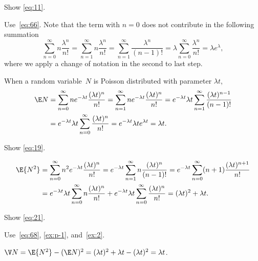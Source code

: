 \begin{exercise} \label{ex:2}
 Show \cref{eq:11}.
\begin{hint}
Use~\cref{eq:66}. Note that the term with $n=0$ does not contribute in the following summation
\begin{equation*}
\sum_{n=0}^\infty n \frac{\lambda^n}{n!} = \sum_{n=1}^\infty n \frac{\lambda^n}{n!} = \sum_{n=1}^\infty \frac{\lambda^n}{(n-1)!} = \lambda \sum_{n=0}^\infty \frac{\lambda^n}{n!} = \lambda e^{\lambda},
\end{equation*}
where we apply a change of notation in the second to last step.
\end{hint}
\begin{solution}
 When a random variable~$N$ is Poisson distributed with parameter
 $\lambda t$,
 \begin{align*}
 \E N
&= \sum_{n=0}^\infty n e^{-\lambda t}\frac{(\lambda t)^n}{n!}
= \sum_{n=1}^\infty n e^{-\lambda t}\frac{(\lambda t)^n}{n!}
= e^{-\lambda t} \lambda t \sum_{n=1}^\infty \frac{(\lambda t)^{n-1}}{(n-1)!} \\
&= e^{-\lambda t} \lambda t \sum_{n=0}^\infty \frac{(\lambda t)^{n}}{n!}
= e^{-\lambda t} \lambda t e^{\lambda t}
= \lambda t.
 \end{align*}
\end{solution}
\end{exercise}

\begin{exercise}\label{ex:p-1}
 Show \cref{eq:19}.
\begin{solution}
 \begin{align*}
 \E{N^2}
&= \sum_{n=0}^\infty n^2 e^{-\lambda t}\frac{(\lambda t)^n}{n!}
= e^{-\lambda t} \sum_{n=1}^\infty n \frac{(\lambda t)^n}{(n-1)!}
= e^{-\lambda t} \sum_{n=0}^\infty (n+1) \frac{(\lambda t)^{n+1}}{n!} \\
&= e^{-\lambda t} \lambda t \sum_{n=0}^\infty n \frac{(\lambda t)^{n}}{n!} +e^{-\lambda t}\lambda t \sum_{n=0}^\infty\frac{(\lambda t)^{n}}{n!}
= (\lambda t)^2 + \lambda t.
\end{align*}
\end{solution}
\end{exercise}

\begin{exercise}\label{ex:pe-53}
 Show \cref{eq:21}.
\begin{hint} Use~\cref{eq:68}, \cref{ex:p-1},  and~\cref{ex:2}.
\end{hint}
\begin{solution}
$\V N = \E{N^2} - (\E N)^2 = (\lambda t)^2 + \lambda t - (\lambda t)^2 = \lambda t$.
\end{solution}
\end{exercise}


